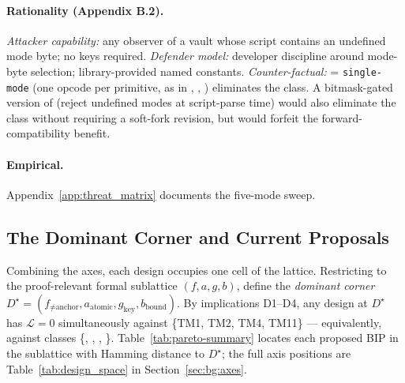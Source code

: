 \paragraph{Rationality (Appendix B.2).} \emph{Attacker capability:}
any observer of a vault whose script contains an undefined mode
byte; no keys required. \emph{Defender model:} developer discipline
around mode-byte selection; library-provided named constants.
\emph{Counter-factual:} \axopsurf{} = \texttt{single-mode} (one
opcode per primitive, as in \opctv{}, \opvault{}, \catcsfs{})
eliminates the class. A bitmask-gated version of \opccv{} (reject
undefined modes at script-parse time) would also eliminate the
class without requiring a soft-fork revision, but would forfeit the
forward-compatibility benefit.

\paragraph{Empirical.} Appendix~\ref{app:threat_matrix} documents the
five-mode sweep.

\subsection{The Dominant Corner and Current Proposals}
\label{sec:imposs:design_space}

Combining the axes, each design occupies one cell of the
lattice. Restricting to the proof-relevant formal sublattice
$(f, a, g, b)$, define the \emph{dominant corner}
$D^\star = (f_{\neq\text{anchor}}, a_{\text{atomic}},
g_{\text{key}}, b_{\text{bound}})$. By implications D1--D4, any
design at $D^\star$ has $\mathcal{L} = 0$ simultaneously against
\{TM1, TM2, TM4, TM11\} --- equivalently, against classes
\{\classfee{}, \classgrief{}, \classscale{}, \classcold{}\}.
Table~\ref{tab:pareto-summary} locates each proposed BIP in the
sublattice with Hamming distance to $D^\star$; the full axis
positions are Table~\ref{tab:design_space} in
Section~\ref{sec:bg:axes}.

